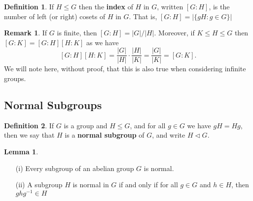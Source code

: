 \documentclass[9pt,reqno]{amsart}
\theoremstyle{definition}
\newtheorem{defi}{Definition}[section]
\newtheorem{lemma}{Lemma}[section]
\newtheorem{rem}{Remark}[section]
\begin{document}
\begin{defi}
If $H \leq G$ then the \textbf{index} of $H$ in $G$, written $[G \colon H]$, is the number of left (or right) cosets of $H$ in $G$. That is, $[G \colon H] = | \{gH \colon g \in G \} |$	
\end{defi}
\begin{rem}
If $G$ is finite, then $[G \colon H ] = |G| / |H|$.	Moreover, if $K \leq H \leq G$ then $[G \colon K ] = [G \colon H ] [H \colon K]$ as we have $$[G \colon H ] [H \colon K] = \frac{|G|}{|H|} \cdot \frac{|H|}{|K|} = \frac{|G|}{|K|} = [G \colon K]. $$ We will note here, without proof, that this is also true when considering infinite groups. 
\end{rem}




\subsection{Normal Subgroups}
\begin{defi}
If $G$ is a group and $H \leq G$, and for all $g \in G$ we have $gH = Hg$, then we say that $H$ is a \textbf{normal subgroup} of $G$, and write $H \lhd G$. 	
\end{defi}
\begin{lemma}
	\begin{itemize}
		\item[(i)] Every subgroup of an abelian group $G$ is normal.
		\item[(ii)] A subgroup $H$ is normal in $G$ if and only if for all $g \in G$ and $h \in H$, then $ghg^{-1} \in H$
	\end{itemize}
\end{lemma}
\end{document}
